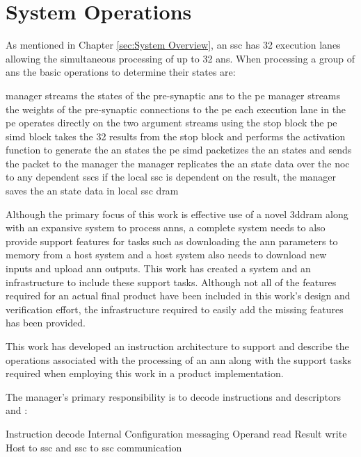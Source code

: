 

\chapter{System Operations}
\label{sec:System Operations}

As mentioned in Chapter \ref{sec:System Overview}, an \ac{ssc} has 32 execution lanes allowing the simultaneous processing of up to 32 \acp{an}.
When processing a group of \acp{an} the basic operations to determine their states are:
\begin{outline}
  \lbbcleanspace
  \1 manager streams the states of the pre-synaptic \acp{an} to the \ac{pe}
  \1 manager streams the weights of the pre-synaptic connections to the \ac{pe}
  \1 each execution lane in the \ac{pe} operates directly on the two argument streams using the \ac{stop} block
  \1 the \ac{pe} \ac{simd} block takes the 32 results from the \ac{stop} block and performs the activation function to generate the \ac{an} states
  \1 the \ac{pe} \ac{simd} packetizes the \ac{an} states and sends the packet to the manager
  \1 the manager replicates the \ac{an} state data over the \ac{noc} to any dependent \acp{ssc}
  \1 if the local \ac{ssc} is dependent on the result, the manager saves the \ac{an} state data in local \ac{ssc} \ac{dram}
\end{outline}

Although the primary focus of this work is effective use of a novel \ac{3ddram} along with an expansive system to process \acp{ann}, a complete system needs to also provide support features for tasks such as downloading the \ac{ann} parameters to memory from a host system and a host system also needs to download new inputs and upload \ac{ann} outputs.
This work has created a system and an infrastructure to include these support tasks.
Although not all of the features required for an actual final product have been included in this work's design and verification effort,  the infrastructure required to easily add the missing features has been provided.

This work has developed an instruction architecture to support and describe the operations associated with the processing of an \ac{ann} along with the support tasks required when employing this work in a product implementation.

\iffalse

The manager's primary responsibility is to decode instructions and descriptors and :

\begin{outline}
    \1 Instruction decode
    \1 Internal Configuration messaging
    \1 Operand read
    \1 Result write
    \1 Host to \ac{ssc} and \ac{ssc} to \ac{ssc} communication
\end{outline}


